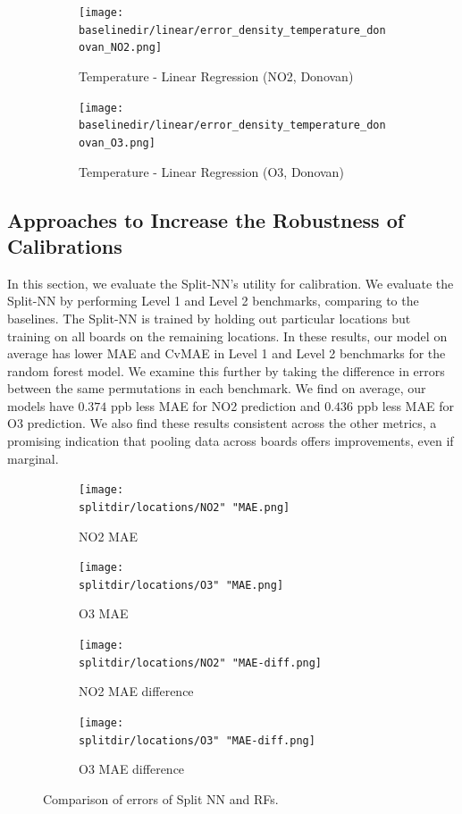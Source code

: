 \documentclass[journal abbreviation, manuscript]{copernicus}
\begin{document}
\begin{figure}[H]
\centering
\begin{subfigure}{0.45\textwidth}
\texttt{[image: \\baselinedir/linear/error\_density\_temperature\_donovan\_NO2.png]}
\caption{Temperature - Linear Regression (NO2, Donovan)}
\end{subfigure}
\begin{subfigure}{0.45\textwidth}
\texttt{[image: \\baselinedir/linear/error\_density\_temperature\_donovan\_O3.png]}
\caption{Temperature - Linear Regression (O3, Donovan)}
\end{subfigure}
\caption{}
\label{fig:target-plots-models}
\end{figure}

\subsection{Approaches to Increase the Robustness of Calibrations}

In this section, we evaluate the Split-NN's utility for calibration.
We evaluate the Split-NN by performing Level 1 and Level 2 benchmarks, comparing to the baselines. The Split-NN is trained by
holding out particular locations but training on all boards on the 
remaining locations.
In these results, our model on average has lower MAE and CvMAE in Level 1 and Level 2 benchmarks for the random forest model. We examine this further
by taking the difference in errors between the same permutations 
in each benchmark. We find on average, our models have $0.374$ ppb less MAE  
for NO2 prediction and $0.436$ ppb less MAE for O3 prediction.
We also find these results consistent across the other metrics,
a promising indication that pooling data across boards offers
improvements, even if marginal.

\begin{figure}[H]
\begin{subfigure}{0.49\textwidth}
\texttt{[image: \\splitdir/locations/NO2" "MAE.png]}
\caption{NO2 MAE}
\end{subfigure}
\begin{subfigure}{0.49\textwidth}
\texttt{[image: \\splitdir/locations/O3" "MAE.png]}
\caption{O3 MAE}
\end{subfigure}
\begin{subfigure}{0.49\textwidth}
\texttt{[image: \\splitdir/locations/NO2" "MAE-diff.png]}
\caption{NO2 MAE difference}
\end{subfigure}
\begin{subfigure}{0.49\textwidth}
\texttt{[image: \\splitdir/locations/O3" "MAE-diff.png]}
\caption{O3 MAE difference}
\end{subfigure}
\caption{Comparison of errors of Split NN and RFs.}
\label{fig:split-comparison}
\end{figure}
\end{document}
